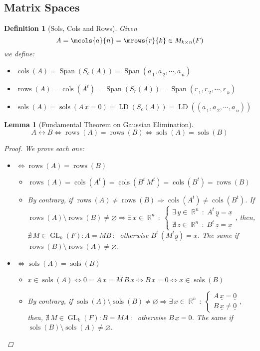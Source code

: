 \documentclass[12pt]{article}
\let\emptyset\varnothing
\let\RA\Rightarrow
\let\LA\Leftarrow
\let\LR\Leftrightarrow
\newcommand{\Exist}[1]{\exists\,{#1}\,:\;}
\newcommand{\NExist}[1]{\nexists\,{#1}\,:\;}
\newcommand{\tuple}[1]{\underline{#1}}
\newcommand{\seqt}[2]{\left(\tuple{#1}_{\,1},\tuple{#1}_{\,2},\cdots,\tuple{#1}_{\,#2}\right)}
\DeclareMathOperator{\R}{\mathbb{R}}
\DeclareMathOperator{\Span}{Span}
\DeclareMathOperator{\sols}{sols}
\DeclareMathOperator{\LD}{LD}
\DeclareMathOperator{\cols}{cols}
\DeclareMathOperator{\rows}{rows}
\DeclareMathOperator{\GL}{GL}
\newtheorem{definition}{Definition}[subsection]
\newtheorem{lemma}{Lemma}[subsection]
\begin{document}
\subsection{Matrix Spaces}

\begin{definition}[Sols, Cols and Rows]
  Given $$A=\mcols{a}{n}=\mrows{r}{k}\in M_{k\times n}(F)$$
  we define:
  \begin{itemize}
    \item[] $\cols(A)=\Span(S_c(A))=\Span\seqt{a}{n}$
    \item[] $\rows(A)=\cols(A^t)=\Span(S_r(A))=\Span\seqt{r}{k}$
    \item[] $\sols(A)=\sols(A\,\tuple{x}=\tuple{0})=\LD(S_c(A))=\LD(\seqt{a}{n})$
  \end{itemize}
\end{definition}

\begin{lemma}[Fundamental Theorem on Gaussian Elimination]
  $$A\leftrightarrow B\LR \rows(A)=\rows(B)\LR \sols(A)=\sols(B)$$
  \begin{proof}
    We prove each one:
    \begin{itemize}
      \item[]$\LR\rows(A)=\rows(B)$ \begin{itemize}
        \item[$(\RA)$] $\rows(A)=\cols(A^t)=\cols(B^t\,M^t)=\cols(B^t)=\rows(B)$
        \item[$(\LA)$] By contrary, if $\rows(A)\neq\rows(B)\RA\cols(A^t)\neq\cols(B^t)$. If $\rows(A)\setminus\rows(B)\neq\emptyset\RA\Exist{x\in\R^n}\begin{cases}\Exist{y\in\R^n}A^t\,\tuple{y}=\tuple{x}\\\NExist{z\in\R^n}B^t\,\tuple{z}=\tuple{x}\end{cases}$, then, $\NExist{M\in\GL_k(F):A=MB}$ otherwise $B^t\,(M^t\tuple{y})=\tuple{x}$. The same if $\rows(B)\setminus\rows(A)\neq\emptyset$.
      \end{itemize}
      \item[]$\LR\sols(A)=\sols(B)$ \begin{itemize}
        \item[$(\RA)$] $\tuple{x}\in\sols(A)\LR \tuple{0}=A\,\tuple{x}=M\,B\,\tuple{x}\LR B\,\tuple{x}=\tuple{0}\LR \tuple{x}\in\sols(B)$
        \item[$(\LA)$] By contrary, if $\sols(A)\setminus\sols(B)\neq\emptyset\RA\Exist{x\in\R^n}\begin{cases}A\,\tuple{x}=\tuple{0}\\B\,\tuple{x}\neq\tuple{0}\end{cases}$, then, $\NExist{M\in\GL_k(F):B=MA}$ otherwise $B\,\tuple{x}=0$. The same if $\sols(B)\setminus\sols(A)\neq\emptyset$.
      \end{itemize}
    \end{itemize}
  \end{proof}
\end{lemma}
\end{document}
